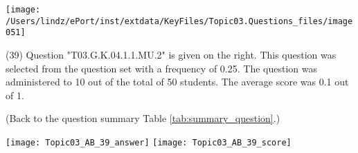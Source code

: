 \documentclass[12pt,english,nohyper]{tufte-handout}\usepackage[]{graphicx}\usepackage[]{color}
\begin{document}
\vspace{5cm}\begin{marginfigure}\texttt{[image: /Users/lindz/ePort/inst/extdata/KeyFiles/Topic03.Questions\_files/image051]}\end{marginfigure}\vspace{-5cm} (39) Question "T03.G.K.04.1.1.MU.2" is given on the right. This question was selected from the question set with a frequency of 0.25. The question was administered to 10 out of the total of 50 students. The average score was 0.1 out of 1.

 (Back to the question summary Table \ref{tab:summary_question}.)

\begin{center} \texttt{[image: Topic03\_AB\_39\_answer]} \texttt{[image: Topic03\_AB\_39\_score]} \end{center} 
\end{document}
